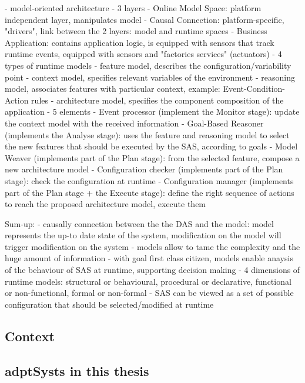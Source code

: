     - model-oriented architecture
        - 3 layers
            - Online Model Space: platform independent layer, manipulates model
            - Causal Connection: platform-specific, "drivers", link between the 2 layers: model and runtime spaces
            - Business Application: contains application logic, is equipped with sensors that track runtime events, equipped with sensors and "factories services" (actuators)
        - 4 types of runtime models
            - feature model, describes the configuration/variability point
            - context model, specifies relevant variables of the environment
            - reasoning model, associates features with particular context, example: Event-Condition-Action rules
            - architecture model, specifies the component composition of the application
        - 5 elements
            - Event processor (implement the Monitor stage): update the context model with the received information
            - Goal-Based Reasoner (implements the Analyse stage): uses the feature and reasoning model to select the new features that should be executed by the SAS, according to goals
            - Model Weaver (implements part of the Plan stage): from the selected feature, compose a new architecture model
            - Configuration checker (implements part of the Plan stage): check the configuration at runtime
            - Configuration manager (implements part of the Plan stage + the Execute stage): define the right sequence of actions to reach the proposed architecture model, execute them 

Sum-up:
    - causally connection between the the DAS and the model: model represents the up-to date state of the system, modification on the model will trigger modification on the system
    - models allow to tame the complexity and the huge amount of information
    - with goal first class citizen, models enable anaysis of the behaviour of SAS at runtime, supporting decision making
    - 4 dimensions of runtime models: structural or behavioural, procedural or declarative, functional or non-functional, formal or non-formal
    - SAS can be viewed as a set of possible configuration that should be selected/modified at runtime 

\subsection{Context}

\subsection[Adaptive systems in the context of this thesis]{\Glspl{adptSyst} in this thesis}

